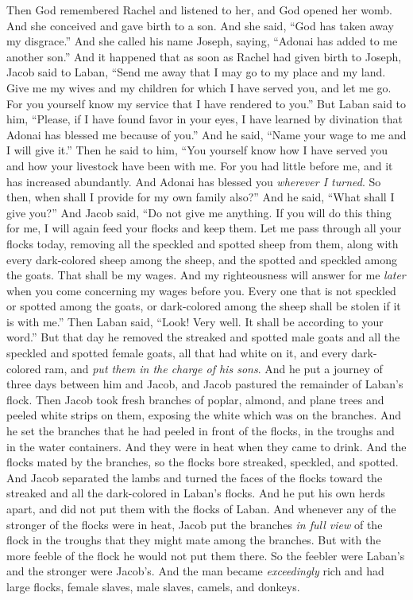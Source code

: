 \begin{biblechapter}
\verse Then God remembered Rachel and listened to her, and God opened her womb.
\verse And she conceived and gave birth to a son. And she said, “God has taken away my disgrace.”
\verse And she called his name Joseph, saying, “Adonai has added to me another son.”
 And it happened that as soon as Rachel had given birth to Joseph, Jacob said to Laban, “Send me away that I may go to my place and my land.
\verse Give me my wives and my children for which I have served you, and let me go. For you yourself know my service that I have rendered to you.”
\verse But Laban said to him, “Please, if I have found favor in your eyes, I have learned by divination that Adonai has blessed me because of you.”
\verse And he said, “Name your wage to me and I will give it.”
\verse Then he said to him, “You yourself know how I have served you and how your livestock have been with me.
\verse For you had little before me, and it has increased abundantly. And Adonai has blessed you \textit{wherever I turned}. So then, when shall I provide for my own family also?”
\verse And he said, “What shall I give you?” And Jacob said, “Do not give me anything. If you will do this thing for me, I will again feed your flocks and keep them.
\verse Let me pass through all your flocks today, removing all the speckled and spotted sheep from them, along with every dark-colored sheep among the sheep, and the spotted and speckled among the goats. That shall be my wages.
\verse And my righteousness will answer for me \textit{later} when you come concerning my wages before you. Every one that is not speckled or spotted among the goats, or dark-colored among the sheep shall be stolen if it is with me.”
\verse Then Laban said, “Look! Very well. It shall be according to your word.”
\verse But that day he removed the streaked and spotted male goats and all the speckled and spotted female goats, all that had white on it, and every dark-colored ram, and \textit{put them in the charge of his sons}.
\verse And he put a journey of three days between him and Jacob, and Jacob pastured the remainder of Laban’s flock.
\verse Then Jacob took fresh branches of poplar, almond, and plane trees and peeled white strips on them, exposing the white which was on the branches.
\verse And he set the branches that he had peeled in front of the flocks, in the troughs and in the water containers. And they were in heat when they came to drink.
\verse And the flocks mated by the branches, so the flocks bore streaked, speckled, and spotted.
\verse And Jacob separated the lambs and turned the faces of the flocks toward the streaked and all the dark-colored in Laban’s flocks. And he put his own herds apart, and did not put them with the flocks of Laban.
\verse And whenever any of the stronger of the flocks were in heat, Jacob put the branches \textit{in full view} of the flock in the troughs that they might mate among the branches.
\verse But with the more feeble of the flock he would not put them there. So the feebler were Laban’s and the stronger were Jacob’s.
\verse And the man became \textit{exceedingly} rich and had large flocks, female slaves, male slaves, camels, and donkeys.
\end{biblechapter}

